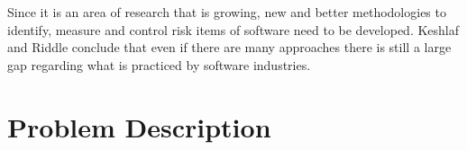 Since it is an area of research that is growing, new and better methodologies to identify, measure and control risk items of software need to be developed. Keshlaf and Riddle \cite{KESHLAFRIDDLE2010} conclude that even if there are many approaches there is still a large gap regarding what is practiced by software industries.

\section{Problem Description}

